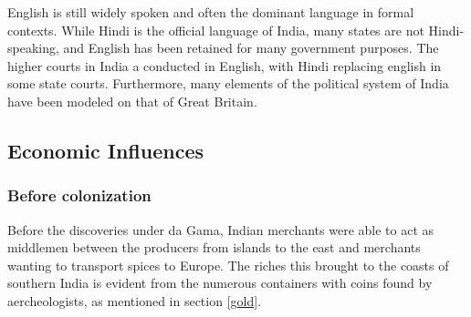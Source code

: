 \documentclass[11pt, a4paper, headings=standardclasses]{scrartcl}
\begin{document}
English is still widely spoken and often the dominant language in formal contexts. While Hindi is the official language of India, many states are not Hindi-speaking, and English has been retained for many government purposes. The higher courts in India a conducted in English, with Hindi replacing english in some state courts. Furthermore, many elements of the political system of India have been modeled on that of Great Britain.

\subsection{Economic Influences}

\subsubsection{Before colonization}

Before the discoveries under da Gama, Indian merchants were able to act as middlemen between the producers from islands to the east and merchants wanting to transport spices to Europe. The riches this brought to the coasts of southern India is evident from the numerous containers with coins found by aercheologists, as mentioned in section \ref{gold}. 

\clearpage
\appendix
{}
\printbibliography
\end{document}
